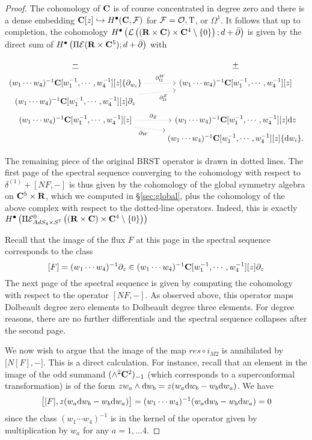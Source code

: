 \documentclass[../main.tex]{subfiles}
\begin{document}
\begin{proof}
The cohomology of $\mathbf{C}$ is of course concentrated in degree zero and there is a dense embedding $\mathbf{C}[z] \hookrightarrow H^\bullet(\mathbf{C}, \mathcal{F})$ for $\mathcal{F} = \mathcal{O}, {\mathrm{T}}$, or $\Omega^1$. It follows that up to completion, the cohomology $H^\bullet \left ( \mathcal{L} \left ( (\mathbf{R}\times \mathbf{C}) \times \mathbf{C}^4\setminus \{0\} \right ); d+\bar{\partial} \right )$ is given by the direct sum of $H^\bullet \left ( \Pi \mathcal{E}  (\mathbf{R}\times \mathbf{C}^5 ); d+\bar{\partial} \right )$ with

\begin{equation}
  \label{eqn:ads4ss2} 
   \begin{tikzcd}[row sep = 1 ex]
    \ul{-} & \ul{+} \\
(w_1\cdots w_4)^{-1}\C[w_1^{-1},\cdots, w_4^{-1}][z] \{\partial_{w_i}\}  \ar[r, dotted, "\div^W"] & (w_1\cdots w_4)^{-1}\C[w_1^{-1},\cdots, w_4^{-1}] [z] \\
(w_1\cdots w_4)^{-1}\C[w_1^{-1},\cdots, w_4^{-1}] [z] \partial_z \ar[ur, dotted, "\div^Z"'] \\
(w_1\cdots w_4)^{-1}\C[w_1^{-1},\cdots, w_4^{-1}] [z] \ar[r, dotted, "\del_Z"] \ar[dr, dotted, "\del_W"'] & (w_1\cdots w_4)^{-1}\C[w_1^{-1},\cdots, w_4^{-1}][z] \d z \\ & (w_1\cdots w_4)^{-1}\C[w_1^{-1},\cdots, w_4^{-1}][z] \{\d w_i\} .
\end{tikzcd}
\end{equation}

The remaining piece of the original BRST operator is drawn in dotted lines. 
The first page of the spectral sequence converging to the cohomology with respect to $\delta^{(1)} + [N F, -]$ is thus given by the cohomology of the global symmetry algebra on $\mathbf{C}^5 \times \mathbf{R}$, which we computed in \S \ref{sec:global}, plus the cohomology of the above complex with respect to the dotted-line operators. Indeed, this is exactly $H^\bullet \left ( \Pi \mathcal{E}^0_{AdS_4\times S^7} \left ( (\mathbf{R}\times \mathbf{C}) \times \mathbf{C}^4\setminus \{0\} \right ) \right )$

Recall that the image of the flux $F$ at this page in the spectral sequence corresponds to the class 
\[
[F] = (w_1 \cdots w_4)^{-1} \partial_z \in (w_1\cdots w_4)^{-1}\mathbf{C}[w_1^{-1},\cdots, w_4^{-1}] [z] \partial_z
\]
The next page of the spectral sequence is given by computing the cohomology with respect to the operator $[N F,-]$. 
As observed above, this operator maps Dolbeault degree zero elements to Dolbeault degree three elements. 
For degree reasons, there are no further differentials and the spectral sequence collapses after the second page. 

We now wish to argue that the image of the map $res\circ i_{M2}$ is annihilated by $\big[ N [F] , - \big]$. This is a direct calculation. For instance, recall that an element in the image of the odd summand $(\wedge^2 \mathbf{C}^2)_{-1}$ (which corresponds to a superconformal transformation) is of the form $z w_a \wedge \mathrm{d} w_b = z(w_a \mathrm{d} w_b - w_b \mathrm{d} w_a)$. 
We have
\[
\big[[F] , z(w_a \mathrm{d} w_b - w_b \mathrm{d} w_a) \big] = (w_1\cdots w_4)^{-1} (w_a \mathrm{d} w_b - w_b \mathrm{d} w_a) = 0
\]
since the class $(w_1\cdots w_4)^{-1}$ is in the kernel of the operator given by multiplication by $w_a$ for any $a = 1,\ldots 4$. 
\end{proof}
\end{document}
